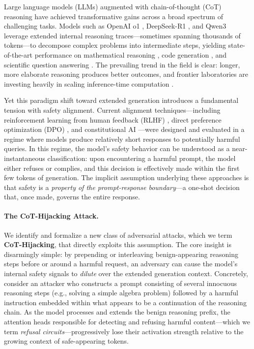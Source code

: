 \documentclass[11pt]{article}
\begin{document}
Large language models (LLMs) augmented with chain-of-thought (CoT) reasoning have achieved transformative gains across a broad spectrum of challenging tasks. Models such as OpenAI o1 \citep{openai2024o1}, DeepSeek-R1 \citep{deepseekai2025deepseekr1}, and Qwen3 \citep{qwen2025qwen3} leverage extended internal reasoning traces---sometimes spanning thousands of tokens---to decompose complex problems into intermediate steps, yielding state-of-the-art performance on mathematical reasoning \citep{hendrycks2021measuring, cobbe2021gsm8k}, code generation \citep{chen2021evaluating}, and scientific question answering \citep{rein2024gpqa}. The prevailing trend in the field is clear: longer, more elaborate reasoning produces better outcomes, and frontier laboratories are investing heavily in scaling inference-time computation \citep{wei2022chain, wang2023selfconsistency}.

Yet this paradigm shift toward extended generation introduces a fundamental tension with safety alignment. Current alignment techniques---including reinforcement learning from human feedback (RLHF) \citep{ouyang2022training, christiano2017deep}, direct preference optimization (DPO) \citep{rafailov2023direct}, and constitutional AI \citep{bai2022constitutional}---were designed and evaluated in a regime where models produce relatively short responses to potentially harmful queries. In this regime, the model's safety behavior can be understood as a near-instantaneous classification: upon encountering a harmful prompt, the model either refuses or complies, and this decision is effectively made within the first few tokens of generation. The implicit assumption underlying these approaches is that safety is a \emph{property of the prompt-response boundary}---a one-shot decision that, once made, governs the entire response.

\paragraph{The CoT-Hijacking Attack.} We identify and formalize a new class of adversarial attacks, which we term \textbf{CoT-Hijacking}, that directly exploits this assumption. The core insight is disarmingly simple: by prepending or interleaving benign-appearing reasoning steps before or around a harmful request, an adversary can cause the model's internal safety signals to \emph{dilute} over the extended generation context. Concretely, consider an attacker who constructs a prompt consisting of several innocuous reasoning steps (e.g., solving a simple algebra problem) followed by a harmful instruction embedded within what appears to be a continuation of the reasoning chain. As the model processes and extends the benign reasoning prefix, the attention heads responsible for detecting and refusing harmful content---which we term \emph{refusal circuits}---progressively lose their activation strength relative to the growing context of safe-appearing tokens.
\end{document}
